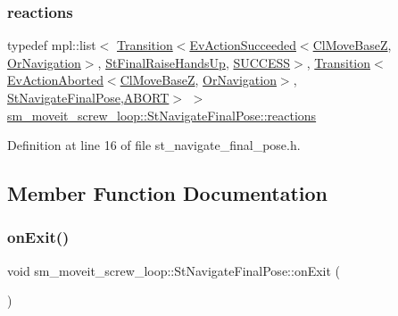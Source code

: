 \subsubsection{\texorpdfstring{reactions}{reactions}}
{\footnotesize\ttfamily typedef mpl\+::list$<$ \hyperlink{classsmacc_1_1Transition}{Transition}$<$\hyperlink{structsmacc_1_1default__events_1_1EvActionSucceeded}{Ev\+Action\+Succeeded}$<$\hyperlink{classcl__move__base__z_1_1ClMoveBaseZ}{Cl\+Move\+BaseZ}, \hyperlink{classsm__moveit__screw__loop_1_1OrNavigation}{Or\+Navigation}$>$, \hyperlink{structsm__moveit__screw__loop_1_1StFinalRaiseHandsUp}{St\+Final\+Raise\+Hands\+Up}, \hyperlink{structsmacc_1_1default__transition__tags_1_1SUCCESS}{S\+U\+C\+C\+E\+SS}$>$, \hyperlink{classsmacc_1_1Transition}{Transition}$<$\hyperlink{structsmacc_1_1default__events_1_1EvActionAborted}{Ev\+Action\+Aborted}$<$\hyperlink{classcl__move__base__z_1_1ClMoveBaseZ}{Cl\+Move\+BaseZ}, \hyperlink{classsm__moveit__screw__loop_1_1OrNavigation}{Or\+Navigation}$>$, \hyperlink{structsm__moveit__screw__loop_1_1StNavigateFinalPose}{St\+Navigate\+Final\+Pose},\hyperlink{structsmacc_1_1default__transition__tags_1_1ABORT}{A\+B\+O\+RT}$>$ $>$ \hyperlink{structsm__moveit__screw__loop_1_1StNavigateFinalPose_a39c3669c37c3e9622977219a07d50b8a}{sm\+\_\+moveit\+\_\+screw\+\_\+loop\+::\+St\+Navigate\+Final\+Pose\+::reactions}}



Definition at line 16 of file st\+\_\+navigate\+\_\+final\+\_\+pose.\+h.



\subsection{Member Function Documentation}
\mbox{\label{structsm__moveit__screw__loop_1_1StNavigateFinalPose_a1088a973aaa34ed58eb5d23a61645dc5}} 
\subsubsection{\texorpdfstring{on\+Exit()}{onExit()}}
{\footnotesize\ttfamily void sm\+\_\+moveit\+\_\+screw\+\_\+loop\+::\+St\+Navigate\+Final\+Pose\+::on\+Exit (\begin{DoxyParamCaption}{ }\end{DoxyParamCaption})\hspace{0.3cm}{\ttfamily [inline]}}



